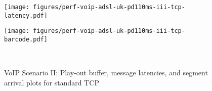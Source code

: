 \begin{figure*}[t!]
{{\begin{minipage}{61mm}
\end{minipage}
\begin{minipage}{61mm}
\texttt{[image: figures/perf-voip-adsl-uk-pd110ms-iii-tcp-latency.pdf]}\vspace{1mm}
\end{minipage}
\begin{minipage}{61mm}
\texttt{[image: figures/perf-voip-adsl-uk-pd110ms-iii-tcp-barcode.pdf]}\vspace{1mm}
\end{minipage}
\begin{minipage}{61mm}~\end{minipage}
}}
\caption{VoIP Scenario II: Play-out buffer, message latencies, and segment arrival plots for standard TCP}
\label{fig:voip-110-tcp}
\end{figure*}

